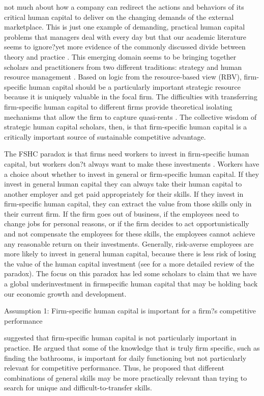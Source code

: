 \documentclass[12pt,letterpaper]{article}
\begin{document}
not much about how a company can redirect the actions and behaviors of its critical human capital to deliver on the changing demands of the external marketplace. This is just one example of demanding, practical human capital problems that managers deal with every day but that our academic literature seems to ignore?yet more evidence of the commonly discussed divide between theory and practice \citep{Bartunek2014}. This emerging domain seems to be bringing together scholars and practitioners from two different traditions: strategy and human resource management \citep{Wright2014}. Based on logic from the resource-based view
(RBV), firm-specific human capital should be a particularly important strategic resource because it is uniquely valuable in the focal firm. The difficulties with transferring firm-specific human capital to different firms provide theoretical isolating mechanisms that allow the firm to capture quasi-rents \citep{Barney1991, Campbell2012}. The collective wisdom of strategic human capital
scholars, then, is that firm-specific human capital is a critically important source of sustainable competitive advantage.

The FSHC paradox is that firms need workers to invest in firm-specific human capital, but workers don?t always want to make these investments \citep{Wang2006}. Workers have a choice about whether to invest in general or firm-specific human capital. If they invest in general human capital they can always take their human capital to another employer and get paid appropriately for their skills. If
they invest in firm-specific human capital, they can extract the value from those skills only in their current firm. If the firm goes out of business, if the employees need to change jobs for personal reasons, or if the firm decides to act opportunistically and not compensate the employees for these skills, the employees cannot achieve any reasonable return on their investments. Generally, risk-averse employees are more likely to invest in general human capital, because there is less risk of losing the value of the human capital investment (see \cite{Wang2006} for a more detailed review of the paradox). The focus on this paradox has led some scholars to claim
that we have a global underinvestment in firmspecific human capital that may be holding back our economic growth and development.

Assumption 1: Firm-specific human capital is
important for a firm?s competitive performance

\cite{Lazear2009} suggested that firm-specific human capital is not particularly important in practice. He argued that some of the knowledge that is truly firm specific, such as finding the bathrooms, is important for daily functioning but not particularly relevant
for competitive performance. Thus, he proposed that different combinations of general skills may be more practically relevant than trying to search for unique and difficult-to-transfer skills.
\end{document}
